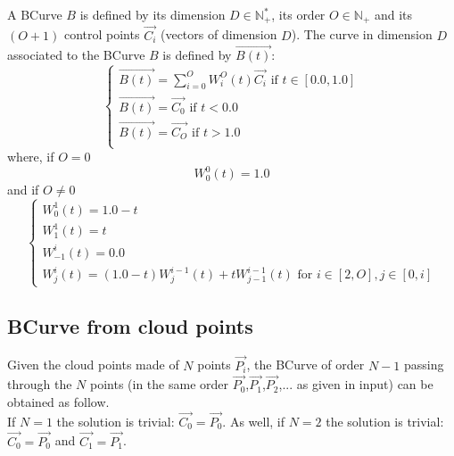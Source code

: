 \documentclass[12pt, a4paper]{article}
\begin{document}
A BCurve $B$ is defined by its dimension $D\in\mathbb{N^*_+}$, its order $O\in\mathbb{N_+}$ and its $(O+1)$ control points $\overrightarrow{C_i}$ (vectors of dimension $D$). The curve in dimension $D$ associated to the BCurve $B$ is defined by $\overrightarrow{B(t)}$:\\
\begin{equation}
\left\lbrace
\begin{array}{l}
\overrightarrow{B(t)}=\sum_{i=0}^OW^O_i(t)\overrightarrow{C_i}\textrm{ if }t\in[0.0,1.0]\\
\overrightarrow{B(t)}=\overrightarrow{C_0}\textrm{ if }t<0.0\\
\overrightarrow{B(t)}=\overrightarrow{C_{O}}\textrm{ if }t>1.0\\
\end{array}
\right.
\end{equation}
where, if $O=0$\\
\begin{equation}
W^0_0(t)=1.0
\end{equation}
and if $O\neq 0$\\
\begin{equation}
\left\lbrace
\begin{array}{l}
W^1_0(t)=1.0-t\\
W^1_1(t)=t\\
W^i_{-1}(t)=0.0\\
W^i_j(t)=(1.0-t)W^{i-1}_j(t)+tW^{i-1}_{j-1}(t)\textrm{ for }i\in[2,O],j\in[0,i]
\end{array}
\right.
\end{equation}

\subsection{BCurve from cloud points}

Given the cloud points made of $N$ points $\overrightarrow{P_i}$, the BCurve of order $N-1$ passing through the $N$ points (in the same order $\overrightarrow{P_0}$,$\overrightarrow{P_1}$,$\overrightarrow{P_2}$,... as given in input) can be obtained as follow.\\

If $N=1$ the solution is trivial: $\overrightarrow{C_0}=\overrightarrow{P_0}$. As well, if $N=2$ the solution is trivial: $\overrightarrow{C_0}=\overrightarrow{P_0}$ and $\overrightarrow{C_1}=\overrightarrow{P_1}$.\\
\end{document}
